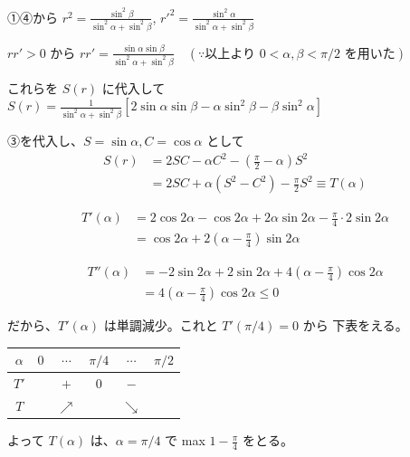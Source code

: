 \documentclass[../main.tex]{subfiles}
\begin{document}
①④から
$r^2 = \frac{\sin^2 \beta}{\sin^2 \alpha + \sin^2 \beta}$, \quad $r'^2 = \frac{\sin^2 \alpha}{\sin^2 \alpha + \sin^2 \beta}$

$r r' > 0$ から
$r r' = \frac{\sin \alpha \sin \beta}{\sin^2 \alpha + \sin^2 \beta} \quad (\because \text{以上より } 0 < \alpha, \beta < \pi/2 \text{ を用いた})$

これらを $S(r)$ に代入して
$S(r) = \frac{1}{\sin^2 \alpha + \sin^2 \beta} \left[ 2 \sin \alpha \sin \beta - \alpha \sin^2 \beta - \beta \sin^2 \alpha \right]$

③を代入し、$S = \sin \alpha, C = \cos \alpha$ として
\begin{align*}
  S(r) &= 2SC - \alpha C^2 - (\frac{\pi}{2} - \alpha) S^2 \\
  &= 2SC + \alpha (S^2 - C^2) - \frac{\pi}{2} S^2 \equiv T(\alpha)
\end{align*}

\begin{align*}
  T'(\alpha) &= 2 \cos 2\alpha - \cos 2\alpha + 2\alpha \sin 2\alpha - \frac{\pi}{4} \cdot 2 \sin 2\alpha \\
  &= \cos 2\alpha + 2(\alpha - \frac{\pi}{4}) \sin 2\alpha
\end{align*}

\begin{align*}
  T''(\alpha) &= -2 \sin 2\alpha + 2 \sin 2\alpha + 4(\alpha - \frac{\pi}{4}) \cos 2\alpha \\
  &= 4(\alpha - \frac{\pi}{4}) \cos 2\alpha \le 0
\end{align*}

だから、$T'(\alpha)$ は単調減少。これと $T'(\pi/4) = 0$ から
下表をえる。

\begin{center}
  \begin{tabular}{|c|c|c|c|c|c|}
    \hline
    $\alpha$ & $0$ & $\cdots$ & $\pi/4$ & $\cdots$ & $\pi/2$ \\
    \hline
    $T'$ & & $+$ & $0$ & $-$ & \\
    \hline
    $T$ & & $\nearrow$ & & $\searrow$ & \\
    \hline
  \end{tabular}
\end{center}

よって $T(\alpha)$ は、$\alpha = \pi/4$ で max $1 - \frac{\pi}{4}$ をとる。
\end{document}
